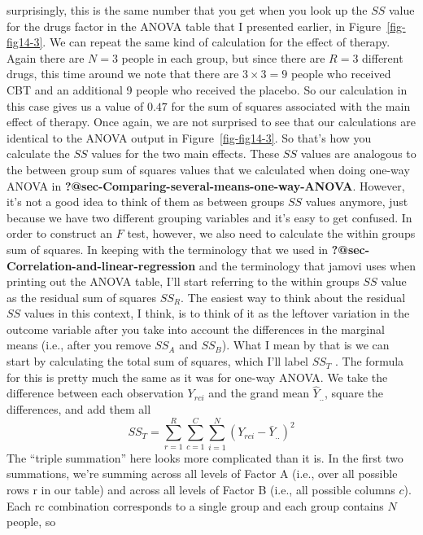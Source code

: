 \documentclass[
  a4paper,
]{book}
\begin{document}
{  surprisingly, this is the same number that you get when you look up
  the \(SS\) value for the drugs factor in the ANOVA table that I
  presented earlier, in Figure~\ref{fig-fig14-3}. We can repeat the same
  kind of calculation for the effect of therapy. Again there are
  \(N = 3\) people in each group, but since there are \(R = 3\)
  different drugs, this time around we note that there are
  \(3 \times 3 = 9\) people who received CBT and an additional 9 people
  who received the placebo. So our calculation in this case gives us a
  value of \(0.47\) for the sum of squares associated with the main
  effect of therapy. Once again, we are not surprised to see that our
  calculations are identical to the ANOVA output in
  Figure~\ref{fig-fig14-3}. So that's how you calculate the \(SS\)
  values for the two main effects. These \(SS\) values are analogous to
  the between group sum of squares values that we calculated when doing
  one-way ANOVA in \textbf{?@sec-Comparing-several-means-one-way-ANOVA}.
  However, it's not a good idea to think of them as between groups
  \(SS\) values anymore, just because we have two different grouping
  variables and it's easy to get confused. In order to construct an
  \(F\) test, however, we also need to calculate the within groups sum
  of squares. In keeping with the terminology that we used in
  \textbf{?@sec-Correlation-and-linear-regression} and the terminology
  that jamovi uses when printing out the ANOVA table, I'll start
  referring to the within groups \(SS\) value as the residual sum of
  squares \(SS_R\). The easiest way to think about the residual \(SS\)
  values in this context, I think, is to think of it as the leftover
  variation in the outcome variable after you take into account the
  differences in the marginal means (i.e., after you remove \(SS_A\) and
  \(SS_B\)). What I mean by that is we can start by calculating the
  total sum of squares, which I'll label \(SS_T\) . The formula for this
  is pretty much the same as it was for one-way ANOVA. We take the
  difference between each observation \(Y_{rci}\) and the grand mean
  \(\hat{Y}_{..}\), square the differences, and add them all
  \[SS_T=\sum_{r=1}^R \sum_{c=1}^C \sum_{i=1}^N (Y_{rci}-\bar{Y}_{..})^2\]
  The ``triple summation'' here looks more complicated than it is. In
  the first two summations, we're summing across all levels of Factor A
  (i.e., over all possible rows r in our table) and across all levels of
  Factor B (i.e., all possible columns \(c\)). Each rc combination
  corresponds to a single group and each group contains \(N\) people, so
}
\end{document}

